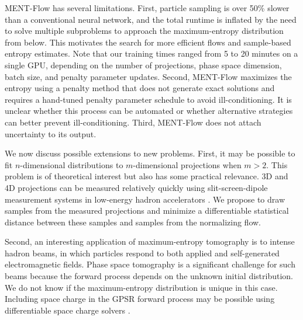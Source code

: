 \documentclass[%
    reprint,
    twocolumn,
    nofootinbib,
    amsmath,
    amssymb,
    aps,
    prstab,
]{revtex4-2}
\begin{document}
MENT-Flow has several limitations. First, particle sampling is over 50\% slower than a conventional neural network, and the total runtime is inflated by the need to solve multiple subproblems to approach the maximum-entropy distribution from below. This motivates the search for more efficient flows and sample-based entropy estimates. Note that our training times ranged from 5 to 20 minutes on a single GPU, depending on the number of projections, phase space dimension, batch size, and penalty parameter updates. Second, MENT-Flow maximizes the entropy using a penalty method that does not generate exact solutions and requires a hand-tuned penalty parameter schedule to avoid ill-conditioning. It is unclear whether this process can be automated or whether alternative strategies can better prevent ill-conditioning. Third, MENT-Flow does not attach uncertainty to its output.

We now discuss possible extensions to new problems. First, it may be possible to fit $n$-dimensional distributions to $m$-dimensional projections when $m > 2$. This problem is of theoretical interest but also has some practical relevance. 3D and 4D projections can be measured relatively quickly using slit-screen-dipole measurement systems in low-energy hadron accelerators \cite{Cathey_2018, Ruisard_2020, Hoover_2023}. We propose to draw samples from the measured projections and minimize a differentiable statistical distance between these samples and samples from the normalizing flow.

Second, an interesting application of maximum-entropy tomography is to intense hadron beams, in which particles respond to both applied and self-generated electromagnetic fields. Phase space tomography is a significant challenge for such beams because the forward process depends on the unknown initial distribution. We do not know if the maximum-entropy distribution is unique in this case. Including space charge in the GPSR forward process may be possible using differentiable space charge solvers \cite{Qiang_2023}.
\end{document}
